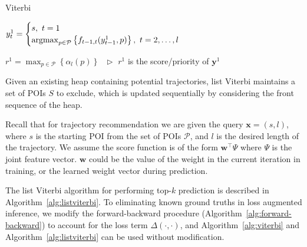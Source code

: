 \begin{algorithm}[htbp]
\caption{Viterbi}
\label{alg:viterbi}
\begin{algorithmic}[1]
  \STATE $y_t^1 = \begin{cases}
                  s,~ t = 1 \\
                  \operatorname*{argmax}_{p \in \mathcal{P}} \left\{ f_{t-1,t}(y_{t-1}^1, p) \right\},~ t = 2,\dots,l
                  \end{cases}$

  \STATE $r^1 = \max_{p \in \mathcal{P}} \left\{ \alpha_{l}(p) \right\}~~~ \triangleright$ $r^1$ is the score/priority of $\mathbf{y}^1$
\end{algorithmic}
\end{algorithm}

Given an existing heap containing potential trajectories,
list Viterbi maintains a set of POIs $S$ to exclude, which is updated
sequentially by considering the front sequence of the heap.

Recall that for trajectory recommendation we are given the query $\mathbf{x}=(s, l)$, where
$s$ is the starting POI from the set of POIs $\mathcal{P}$,
and $l$ is the desired length of the trajectory.
We assume the score function is of the form $\mathbf{w}^\top \Psi$ where $\Psi$ is the joint
feature vector. $\mathbf{w}$ could be the value of the weight in the current iteration in training,
or the learned weight vector during prediction.

The list Viterbi algorithm for performing top-$k$ prediction is described in Algorithm~\ref{alg:listviterbi}.
To eliminating known ground truths in loss augmented inference,
we modify the forward-backward procedure (Algorithm~\ref{alg:forward-backward}) to account for the loss term $\Delta(\cdot,\cdot)$,
and Algorithm~\ref{alg:viterbi} and Algorithm~\ref{alg:listviterbi} can be used without modification.

